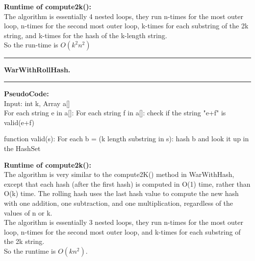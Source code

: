 \documentclass[11pt]{article}
\newcommand\question[2]{\vspace{.25in}\hrule\textbf{#1. #2}\vspace{.5em}\hrule\vspace{.10in}}
\begin{document}
\textbf{Runtime of compute2k():}\\
The algorithm is essentially 4 nested loops, they run n-times for the most outer loop, n-times for the second most outer loop, k-times for each substring of the 2k string, and k-times for the hash of the k-length string.\\
So the run-time is $O(k^2n^2)$


\question{WarWithRollHash}{}

\textbf{PseudoCode:}\\
Input: int k, Array a[]\\
	For each string e in a[]:
		For each string f in a[]:
			check if the string "e+f" is valid(e+f)
			
function valid(s):
	For each b = (k length substring in s):
		hash b and look it up in the HashSet

\textbf{Runtime of compute2k():}\\
The algorithm is very similar to the compute2K() method in WarWithHash, except that each hash (after the first hash) is computed in O(1) time, rather than O(k) time. The rolling hash uses the last hash value to compute the new hash with one addition, one subtraction, and one multiplication, regardless of the values of n or k.\\
The algorithm is essentially 3 nested loops, they run n-times for the most outer loop, n-times for the second most outer loop, and k-times for each substring of the 2k string.\\
So the runtime is $O(kn^2).$
\end{document}
